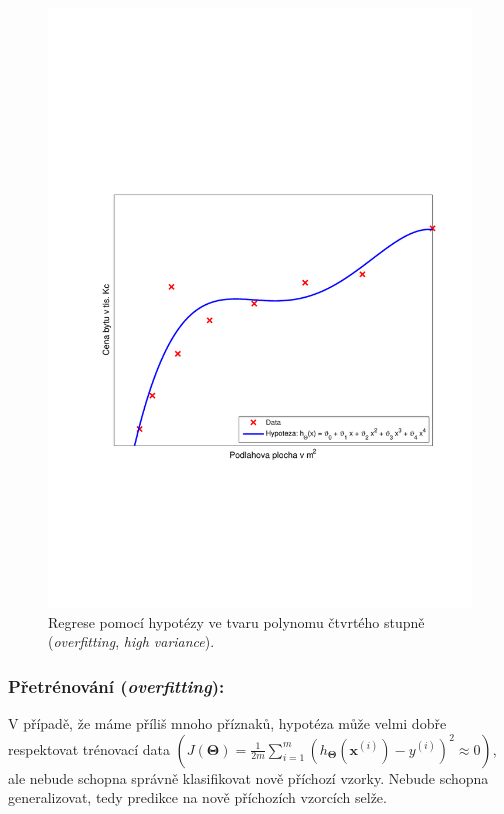 \begin{figure}[!ht]
\begin{minipage}[t]{0.48\textwidth}
		\label{fig:regrese_2}
	\end{minipage}%
	\hfill
	\begin{minipage}[t]{0.48\textwidth}
		\includegraphics[width = \textwidth, trim = 2.5cm 7cm 2cm 9cm]{./Img/Regularizace/Pretrenovani1D/regrese_4.pdf}
  		\caption{Regrese pomocí hypotézy ve tvaru polynomu čtvrtého stupně (\textit{overfitting}, \textit{high variance}).}
		\label{fig:regrese_4}
	\end{minipage}%
\end{figure}

\subsubsection*{Přetrénování (\textit{overfitting}):}
\par{V případě, že máme příliš mnoho příznaků, hypotéza může velmi dobře respektovat trénovací data $\left( J \left( \bm{\Theta} \right) = \frac{1}{2m} \sum_{i=1}^{m} \left( h_{\bm{\Theta}} \left( \bm{x}^{\left( i \right)} \right) - y^{\left( i \right)} \right)^2 \approx 0 \right)$, ale nebude schopna správně klasifikovat nově příchozí vzorky. Nebude schopna generalizovat, tedy predikce na nově příchozích vzorcích selže.}

